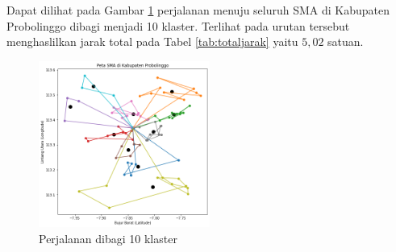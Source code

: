 Dapat dilihat pada Gambar \ref{fig:hasil_mtsp10} perjalanan menuju seluruh SMA di Kabupaten Probolinggo dibagi menjadi 10 klaster. Terlihat pada urutan tersebut menghaslilkan jarak total pada Tabel \ref{tab:totaljarak} yaitu $5,02$ satuan.

\begin{figure}[H]
\centering
\includegraphics[width=0.5\textwidth]{Gambar/hasil_mtsp/10}
\caption{Perjalanan dibagi 10 klaster}
\label{fig:hasil_mtsp10}
\end{figure}

